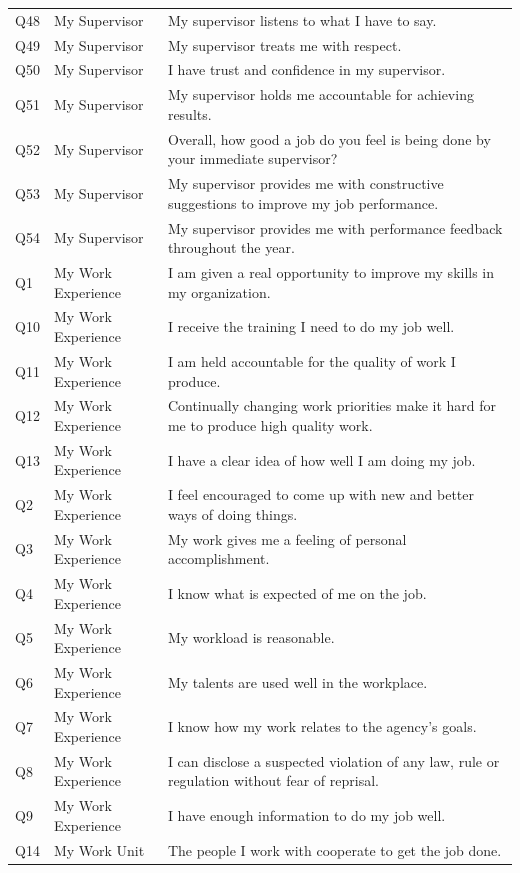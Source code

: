 \documentclass[
  man]{apa7}
\newenvironment{lltable}{\begin{landscape}\centering\begin{ThreePartTable}}{\end{ThreePartTable}\end{landscape}}
\begin{document}
\begin{lltable}
{\begin{longtable}{lll}
Q48 & My Supervisor & My supervisor listens to what I have to say.\\
Q49 & My Supervisor & My supervisor treats me with respect.\\
Q50 & My Supervisor & I have trust and confidence in my supervisor.\\
Q51 & My Supervisor & My supervisor holds me accountable for achieving results.\\
Q52 & My Supervisor & Overall, how good a job do you feel is being done by your immediate supervisor?\\
Q53 & My Supervisor & My supervisor provides me with constructive suggestions to improve my job performance.\\
Q54 & My Supervisor & My supervisor provides me with performance feedback throughout the year.\\
Q1 & My Work Experience & I am given a real opportunity to improve my skills in my organization.\\
Q10 & My Work Experience & I receive the training I need to do my job well.\\
Q11 & My Work Experience & I am held accountable for the quality of work I produce.\\
Q12 & My Work Experience & Continually changing work priorities make it hard for me to produce high quality work.\\
Q13 & My Work Experience & I have a clear idea of how well I am doing my job.\\
Q2 & My Work Experience & I feel encouraged to come up with new and better ways of doing things.\\
Q3 & My Work Experience & My work gives me a feeling of personal accomplishment.\\
Q4 & My Work Experience & I know what is expected of me on the job.\\
Q5 & My Work Experience & My workload is reasonable.\\
Q6 & My Work Experience & My talents are used well in the workplace.\\
Q7 & My Work Experience & I know how my work relates to the agency's goals.\\
Q8 & My Work Experience & I can disclose a suspected violation of any law, rule or regulation without fear of reprisal.\\
Q9 & My Work Experience & I have enough information to do my job well.\\
Q14 & My Work Unit & The people I work with cooperate to get the job done.\\

\end{longtable}}
\end{lltable}
\end{document}
